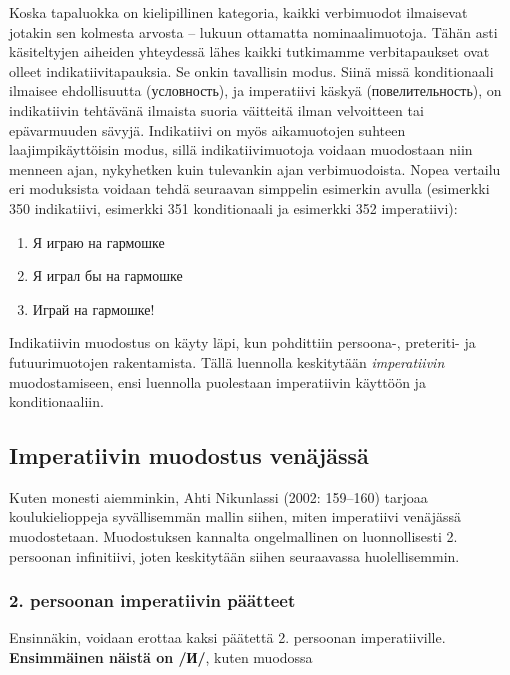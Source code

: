 \documentclass[]{scrartcl}
\providecommand{\tightlist}{%
  \setlength{\itemsep}{0pt}\setlength{\parskip}{0pt}}
\begin{document}
Koska tapaluokka on kielipillinen kategoria, kaikki verbimuodot
ilmaisevat jotakin sen kolmesta arvosta -- lukuun ottamatta
nominaalimuotoja. Tähän asti käsiteltyjen aiheiden yhteydessä lähes
kaikki tutkimamme verbitapaukset ovat olleet indikatiivitapauksia. Se
onkin tavallisin modus. Siinä missä konditionaali ilmaisee ehdollisuutta
(условность), ja imperatiivi käskyä (повелительность), on indikatiivin
tehtävänä ilmaista suoria väitteitä ilman velvoitteen tai epävarmuuden
sävyjä. Indikatiivi on myös aikamuotojen suhteen laajimpikäyttöisin
modus, sillä indikatiivimuotoja voidaan muodostaan niin menneen ajan,
nykyhetken kuin tulevankin ajan verbimuodoista. Nopea vertailu eri
moduksista voidaan tehdä seuraavan simppelin esimerkin avulla (esimerkki
350 indikatiivi, esimerkki 351 konditionaali ja esimerkki 352
imperatiivi):

\begin{enumerate}
\def\labelenumi{(\arabic{enumi})}
\setcounter{enumi}{349}
\tightlist
\item
  Я играю на гармошке
\item
  Я играл бы на гармошке
\item
  Играй на гармошке!
\end{enumerate}

Indikatiivin muodostus on käyty läpi, kun pohdittiin persoona-,
preteriti- ja futuurimuotojen rakentamista. Tällä luennolla keskitytään
\emph{imperatiivin} muodostamiseen, ensi luennolla puolestaan
imperatiivin käyttöön ja konditionaaliin.

\subsection{Imperatiivin muodostus
venäjässä}\label{imperatiivin-muodostus-venuxe4juxe4ssuxe4}

Kuten monesti aiemminkin, Ahti Nikunlassi (2002: 159--160) tarjoaa
koulukielioppeja syvällisemmän mallin siihen, miten imperatiivi
venäjässä muodostetaan. Muodostuksen kannalta ongelmallinen on
luonnollisesti 2. persoonan infinitiivi, joten keskitytään siihen
seuraavassa huolellisemmin.

\subsubsection{2. persoonan imperatiivin
päätteet}\label{persoonan-imperatiivin-puxe4uxe4tteet}

Ensinnäkin, voidaan erottaa kaksi päätettä 2. persoonan imperatiiville.
\textbf{Ensimmäinen näistä on /И/}, kuten muodossa
\end{document}
